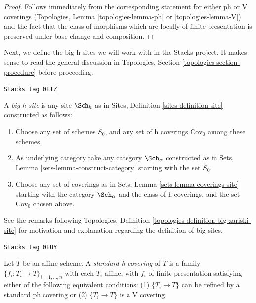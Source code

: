 \begin{proof}
Follows immediately from the corresponding statement for
either ph or V coverings
(Topologies, Lemma \ref{topologies-lemma-ph} or
\ref{topologies-lemma-V})
and the fact that the class of morphisms which are locally
of finite presentation is preserved under base change and
composition.
\end{proof}

Next, we define the big h sites we will work with in the
Stacks project. It makes sense to read the general discussion
in Topologies, Section \ref{topologies-section-procedure}
before proceeding.

\begin{definition}
\label{flat-definition-big-h-site}
\href{https://stacks.math.columbia.edu/tag/0ETZ}{\texttt{Stacks tag 0ETZ}}

A {\it big h site} is any site $\Sch_h$ as in
Sites, Definition \ref{sites-definition-site} constructed as follows:
\begin{enumerate}
\item Choose any set of schemes $S_0$, and any set of h coverings
$\text{Cov}_0$ among these schemes.
\item As underlying category take any category $\Sch_\alpha$
constructed as in Sets, Lemma \ref{sets-lemma-construct-category}
starting with the set $S_0$.
\item Choose any set of coverings as in
Sets, Lemma \ref{sets-lemma-coverings-site} starting with the
category $\Sch_\alpha$ and the class of h coverings,
and the set $\text{Cov}_0$ chosen above.
\end{enumerate}
\end{definition}

See the remarks following
Topologies, Definition \ref{topologies-definition-big-zariski-site}
for motivation and explanation regarding the definition of big sites.

\begin{definition}[Standard h]
\label{flat-definition-standard-h}
\href{https://stacks.math.columbia.edu/tag/0EUY}{\texttt{Stacks tag 0EUY}}

Let $T$ be an affine scheme. A {\it standard h covering} of $T$
is a family $\{f_i : T_i \to T\}_{i = 1, \ldots, n}$ with each $T_i$
affine, with $f_i$ of finite presentation satisfying either of the
following equivalent conditions: (1) $\{T_i \to T\}$ can be refined by
a standard ph covering or (2) $\{T_i \to T\}$ is a V covering.
\end{definition}

